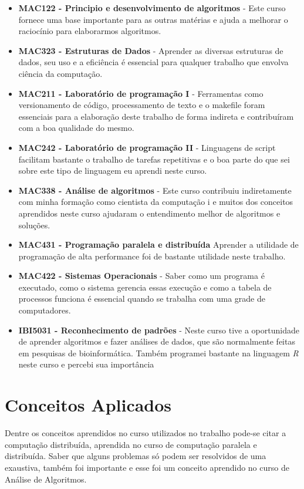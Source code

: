 \begin{itemize}
  \item \textbf{MAC122 - Principio e desenvolvimento de algoritmos } - Este curso fornece uma base importante para as outras matérias e
ajuda a melhorar o raciocínio para elaborarmos algoritmos.
  \item \textbf{MAC323 - Estruturas de Dados } - Aprender as diversas estruturas de dados, seu uso e a eficiência é essencial
para qualquer trabalho que envolva ciência da computação.
  \item \textbf{MAC211 - Laboratório de programação I} - Ferramentas como versionamento de código, processamento de 
texto e o makefile foram essenciais para a elaboração deste trabalho de forma indireta e contribuíram com a 
boa qualidade do mesmo.
  \item \textbf{MAC242 - Laboratório de programação II} - Linguagens de script facilitam bastante o trabalho de tarefas 
repetitivas e o boa parte do que sei sobre este tipo de linguagem eu aprendi neste curso.
  \item \textbf{MAC338 - Análise de algoritmos} - Este curso contribuiu indiretamente com minha formação como cientista da computação i
e muitos dos conceitos aprendidos neste curso ajudaram o entendimento melhor de algoritmos e soluções.
  \item \textbf{MAC431 - Programação paralela e distribuída} Aprender a utilidade de programação de alta performance foi de bastante utilidade
neste trabalho.
  \item \textbf{MAC422 - Sistemas Operacionais} - Saber como um programa é executado, como o sistema gerencia essas execução e como a tabela de processos
funciona é essencial quando se trabalha com uma grade de computadores. 
  \item \textbf{IBI5031 - Reconhecimento de padrões} - Neste curso tive a oportunidade de aprender algoritmos e fazer análises de dados, 
que são normalmente feitas em pesquisas de bioinformática. Também programei bastante na linguagem \emph{R} neste curso e percebi sua
importância
\end{itemize}

\section{Conceitos Aplicados}

Dentre os conceitos aprendidos no curso utilizados no trabalho pode-se citar a computação distribuída, aprendida no curso de
computação paralela e distribuída. Saber que alguns problemas só podem ser resolvidos de uma exaustiva, também 
foi importante e esse foi um conceito aprendido no curso de Análise de Algoritmos.  


